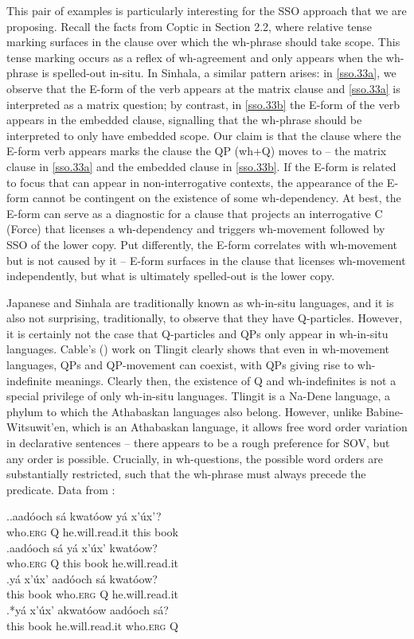 \documentclass{glossa}
\begin{document}
This pair of examples is particularly interesting for the SSO approach that we are proposing. Recall the facts from Coptic in Section 2.2, where relative tense marking surfaces in the clause over which the wh-phrase should take scope. This tense marking occurs as a reflex of wh-agreement and only appears when the wh-phrase is spelled-out in-situ. In Sinhala, a similar pattern arises: in \ref{sso.33a}, we observe that the E-form of the verb appears at the matrix clause and \ref{sso.33a} is interpreted as a matrix question; by contrast, in \ref{sso.33b} the E-form of the verb appears in the embedded clause, signalling that the wh-phrase should be interpreted to only have embedded scope. Our claim is that the clause where the E-form verb appears marks the clause the QP (wh+Q) moves to -- the matrix clause in \ref{sso.33a} and the embedded clause in \ref{sso.33b}. If the E-form is related to focus that can appear in non-interrogative contexts, the appearance of the E-form cannot be contingent on the existence of some wh-dependency. At best, the E-form can serve as a diagnostic for a clause that projects an interrogative C (Force) that licenses a wh-dependency and triggers wh-movement followed by SSO of the lower copy. Put differently, the E-form correlates with wh-movement but is not caused by it -- E-form surfaces in the clause that licenses wh-movement independently, but what is ultimately spelled-out is the lower copy.

Japanese and Sinhala are traditionally known as wh-in-situ languages, and it is also not surprising, traditionally, to observe that they have Q-particles. However, it is certainly not the case that Q-particles and QPs only appear in wh-in-situ languages. Cable's (\citeyear{cable:2007}) work on Tlingit clearly shows that even in wh-movement languages, QPs and QP-movement can coexist, with QPs giving rise to wh-indefinite meanings. Clearly then, the existence of Q and wh-indefinites is not a special privilege of only wh-in-situ languages. Tlingit is a Na-Dene language, a phylum to which the Athabaskan languages also belong. However, unlike Babine-Witsuwit'en, which is an Athabaskan language, it allows free word order variation in declarative sentences -- there appears to be a rough preference for SOV, but any order is possible. Crucially, in wh-questions, the possible word orders are substantially restricted, such that the wh-phrase must always precede the predicate. Data from \cite[63--66]{cable:2007}:

\ex.\ag.aad\'ooch s\'a kwat\'oow y\'a x'\'ux'?\\
   who.\textsc{erg} Q he.will.read.it this book\\
   \bg.aad\'ooch s\'a y\'a x'\'ux' kwat\'oow?\\
   who.\textsc{erg} Q this book he.will.read.it\\
   \bg.y\'a x'\'ux' aad\'ooch s\'a kwat\'oow?\\
   this book  who.\textsc{erg} Q he.will.read.it\\
   \bg.*\label{sso.40d}y\'a x'\'ux' akwat\'oow aad\'ooch s\'a?\\
   this book he.will.read.it who.\textsc{erg} Q\\
\end{document}
